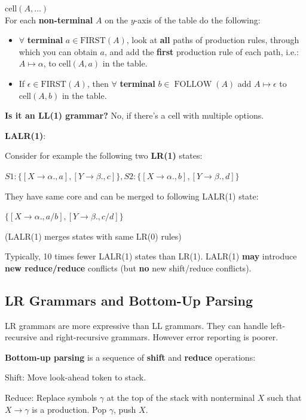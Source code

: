 \begin{algorithm} $\text{cell}(A, \ldots)$ \\
For each \textbf{non-terminal} $A$ on the $y$-axis of the table do the following:
\begin{itemize}    
    \item $\forall$ \textbf{terminal} $a \in \text{FIRST}(A)$, look at \textbf{all} paths of production rules, through which you can obtain $a$, and add the \textbf{first} production rule of each path, i.e.: $A \mapsto \alpha$, to $\text{cell}(A,a)$ in the table.
    
    \item If $\epsilon \in \text{FIRST}(A)$, then $\forall$ \textbf{terminal} $b \in \operatorname{FOLLOW}(A)$ add $A \mapsto \epsilon$ to $\text{cell}(A,b)$ in the table.
    
\end{itemize}

\end{algorithm}

\textbf{Is it an LL(1) grammar?} No, if there's a cell with multiple options.\medskip

\textbf{LALR(1)}:

Consider for example the following two \textbf{LR(1)} states:

$S1:\{[X \rightarrow \alpha., a], [Y \rightarrow \beta., c]\}, S2:\{[X \rightarrow \alpha., b], [Y \rightarrow \beta., d]\}$

They have same core and can be merged to following LALR(1) state:

$\{[X \rightarrow \alpha., a/b], [Y \rightarrow \beta., c/d]\}$ 

(LALR(1) merges states with same LR(0) rules)

Typically, 10 times fewer LALR(1) states than LR(1). LALR(1) \textbf{may} introduce \textbf{new reduce/reduce} conflicts (but \textbf{no} new shift/reduce conflicts).

\subsection*{LR Grammars and Bottom-Up Parsing}

LR grammars are more expressive than LL grammars. They can handle left-recursive and right-recursive grammars. However error reporting is poorer. \medskip

\textbf{Bottom-up parsing} is a sequence of \textbf{shift} and \textbf{reduce} operations:
\begin{compactitem}[$\quad\bullet$]
	\item Shift: Move look-ahead token to stack.

	\item Reduce: Replace symbols $\gamma$ at the top of the stack with nonterminal $X$ such that $X \to \gamma$ is a production. Pop $\gamma$, push $X$.
\end{compactitem}

